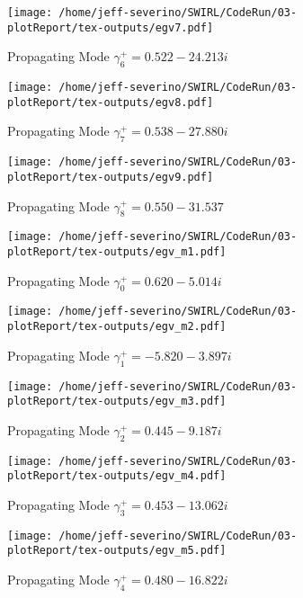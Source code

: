 \documentclass[a4paper]{article}
\begin{document}
 \begin{figure}
     \centering
     \texttt{[image: /home/jeff-severino/SWIRL/CodeRun/03-plotReport/tex-outputs/egv7.pdf]}
     \caption{Propagating Mode $\gamma^+_6 = 0.522 - 24.213i$}
     \label{fig:8} 
 \end{figure}

 \begin{figure}
     \centering
     \texttt{[image: /home/jeff-severino/SWIRL/CodeRun/03-plotReport/tex-outputs/egv8.pdf]}
     \caption{Propagating Mode $\gamma^+_7 = 0.538 - 27.880i$}
     \label{fig:9} 
 \end{figure}


 \begin{figure}
     \centering
     \texttt{[image: /home/jeff-severino/SWIRL/CodeRun/03-plotReport/tex-outputs/egv9.pdf]}
     \caption{Propagating Mode $\gamma^+_8 = 0.550 - 31.537$}
     \label{fig:10} 
 \end{figure}


 \begin{figure}
     \centering
     \texttt{[image: /home/jeff-severino/SWIRL/CodeRun/03-plotReport/tex-outputs/egv\_m1.pdf]}
     \caption{Propagating Mode $\gamma^+_0 = 0.620-5.014i$}
     \label{fig:11} 
 \end{figure}


 \begin{figure}
     \centering
     \texttt{[image: /home/jeff-severino/SWIRL/CodeRun/03-plotReport/tex-outputs/egv\_m2.pdf]}
     \caption{Propagating Mode $\gamma^+_1 = -5.820-3.897i$}
     \label{fig:12} 
 \end{figure}


 \begin{figure}
     \centering
     \texttt{[image: /home/jeff-severino/SWIRL/CodeRun/03-plotReport/tex-outputs/egv\_m3.pdf]}
     \caption{Propagating Mode $\gamma^+_2 = 0.445-9.187i$}
     \label{fig:13} 
 \end{figure}


 \begin{figure}
     \centering
     \texttt{[image: /home/jeff-severino/SWIRL/CodeRun/03-plotReport/tex-outputs/egv\_m4.pdf]}
     \caption{Propagating Mode $\gamma^+_3 = 0.453-13.062i$}
     \label{fig:14} 
 \end{figure}


 \begin{figure}
     \centering
     \texttt{[image: /home/jeff-severino/SWIRL/CodeRun/03-plotReport/tex-outputs/egv\_m5.pdf]}
     \caption{Propagating Mode $\gamma^+_4 = 0.480 - 16.822i$}
     \label{fig:15} 
 \end{figure}
\end{document}
